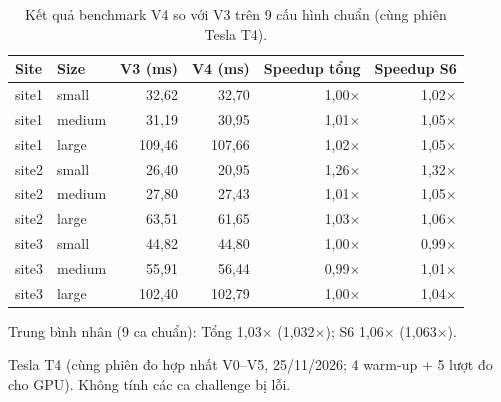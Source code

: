 \begin{table}
\centering
\caption{Kết quả benchmark V4 so với V3 trên 9 cấu hình chuẩn (cùng phiên Tesla T4).}
\scriptsize
\begin{tabular}{llrrrr}
\toprule
Site & Size & V3 (ms) & V4 (ms) & Speedup tổng & Speedup S6 \\
\midrule
site1 & small & 32,62 & 32,70 & 1,00$\times$ & 1,02$\times$ \\
site1 & medium & 31,19 & 30,95 & 1,01$\times$ & 1,05$\times$ \\
site1 & large & 109,46 & 107,66 & 1,02$\times$ & 1,05$\times$ \\
site2 & small & 26,40 & 20,95 & 1,26$\times$ & 1,32$\times$ \\
site2 & medium & 27,80 & 27,43 & 1,01$\times$ & 1,05$\times$ \\
site2 & large & 63,51 & 61,65 & 1,03$\times$ & 1,06$\times$ \\
site3 & small & 44,82 & 44,80 & 1,00$\times$ & 0,99$\times$ \\
site3 & medium & 55,91 & 56,44 & 0,99$\times$ & 1,01$\times$ \\
site3 & large & 102,40 & 102,79 & 1,00$\times$ & 1,04$\times$ \\
\bottomrule
\end{tabular}
\end{table}
\centering
\scriptsize Trung bình nhân (9 ca chuẩn): Tổng 1,03$\times$ (1,032$\times$); S6 1,06$\times$ (1,063$\times$).
\par\tiny Tesla T4 (cùng phiên đo hợp nhất V0--V5, 25/11/2026; 4 warm-up + 5 lượt đo cho GPU). Không tính các ca challenge bị lỗi.
